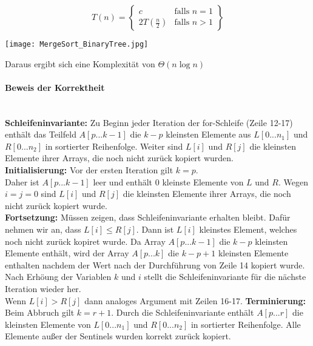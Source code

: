 	\begin{center}
		\[
			T(n) = \left\{\begin{array}{lr}
				c & \text{falls } n = 1 \\
				2T(\frac{n}{2}) & \text{falls } n > 1 
				\end{array}\right\}
		\] \vspace{0.35cm}

		\texttt{[image: MergeSort\_BinaryTree.jpg]}
	\end{center}

	Daraus ergibt sich eine Komplexität von $\Theta(n \log n)$ \\



	\paragraph{Beweis der Korrektheit} \mbox{} \\
	\textbf{Schleifeninvariante:} Zu Beginn jeder Iteration der for-Schleife (Zeile 12-17) enthält 
	das Teilfeld $A[p...k-1]$ die $k-p$ kleinsten Elemente aus $L[0...n_1]$ und $R[0...n_2]$ 
	in sortierter Reihenfolge. Weiter sind $L[i]$ und $R[j]$ die kleinsten Elemente ihrer 
	Arrays, die noch nicht zurück kopiert wurden. \\
	\textbf{Initialisierung:} Vor der ersten Iteration gilt $k = p$. \\ Daher ist $A[p...k-1]$
	leer und enthält $0$ kleinste Elemente von $L$ und $R$. Wegen $i = j = 0$ sind $L[i]$ und
	$R[j]$ die kleinsten Elemente ihrer Arrays, die noch nicht zurück kopiert wurde. \\
	\textbf{Fortsetzung:} Müssen zeigen, dass Schleifeninvariante erhalten bleibt. Dafür nehmen wir an,
	dass $L[i] \leq R[j]$. Dann ist $L[i]$ kleinstes Element, welches noch nicht zurück kopiret wurde.
	Da Array $A[p...k-1]$ die $k - p$ kleinsten Elemente enthält, wird der Array $A[p...k]$ die 
	$k - p + 1$ kleinsten Elemente enthalten nachdem der Wert nach der Durchführung von Zeile 14 
	kopiert wurde. Nach Erhöung der Variablen $k$ und $i$ stellt die Schleifeninvariante für die 
	nächste Iteration wieder her. \\ Wenn $L[i] > R[j]$ dann analoges Argument mit Zeilen 16-17.
	\textbf{Terminierung:} Beim Abbruch gilt $k = r + 1$. Durch die Schleifeninvariante enthält 
	$A[p...r]$ die kleinsten Elemente von $L[0...n_1]$ und $R[0...n_2]$ in sortierter Reihenfolge.
	Alle Elemente au\ss er der Sentinels wurden korrekt zurück kopiert.




